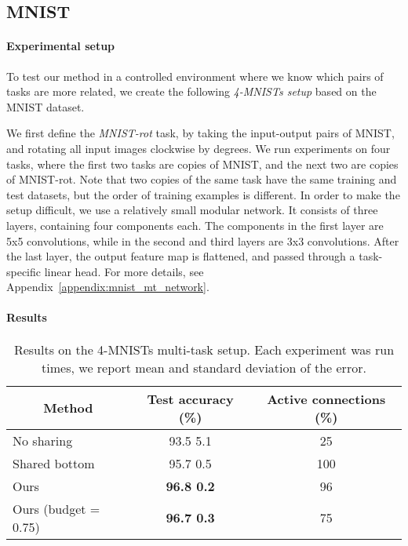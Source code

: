 \documentclass[conference]{IEEEtran}
\begin{document}
\subsection{MNIST}

\paragraph{Experimental setup}
To test our method in a controlled environment where we know which pairs of tasks are more related, we create the following \textit{4-MNISTs setup} based on the MNIST dataset.

We first define the \textit{MNIST-rot} task, by taking the input-output pairs of MNIST, and rotating all input images clockwise by  degrees.
We run experiments on four tasks, where the first two tasks are copies of MNIST, and the next two are copies of MNIST-rot. Note that two copies of the same task have the same training and test datasets, but the order of training examples is different.
In order to make the setup difficult, we use a relatively small modular network. It consists of three layers, containing four components each. The components in the first  layer are 5x5 convolutions, while in the second and third layers are 3x3 convolutions. After the last layer, the output feature map is flattened, and passed through a task-specific linear head.
For more details, see Appendix~\ref{appendix:mnist_mt_network}.

\paragraph{Results}

\begin{table}[t]
\caption{Results on the 4-MNISTs multi-task setup. Each experiment was run  times, we report mean and standard deviation of the error.}
\label{tab:mnist}
\begin{center}
\begin{tabular}{lcc}
\toprule
\multicolumn{1}{c}{\bf Method}  &\multicolumn{1}{c}{\bf Test accuracy (\%)} &\multicolumn{1}{c}{\bf Active connections (\%)} \\
\midrule
No sharing                      & 93.5  5.1          & 25      \\
Shared bottom                    & 95.7  0.5          & 100     \\
\midrule
Ours                   & \bf{96.8  0.2}     & 96      \\
Ours (budget = 0.75)   & \bf{96.7  0.3}     & 75      \\
\bottomrule
\end{tabular}
\end{center}
\end{table}
\end{document}
